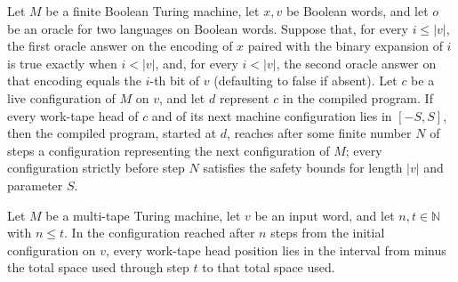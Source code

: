 \begin{theorem}
\label{Complexity.LogProg.OIS.represented_step}
\leanok
{}
Let $M$ be a finite Boolean Turing machine, let $x,v$ be Boolean words, and let $o$ be
an oracle for two languages on Boolean words. Suppose that, for every $i\le |v|$, the
first oracle answer on the encoding of $x$ paired with the binary expansion of $i$ is
true exactly when $i<|v|$, and, for every $i<|v|$, the second oracle answer on that
encoding equals the $i$-th bit of $v$ (defaulting to false if absent). Let $c$ be a live
configuration of $M$ on $v$, and let $d$ represent $c$ in the compiled program. If every
work-tape head of $c$ and of its next machine configuration lies in $[-S,S]$, then the
compiled program, started at $d$, reaches after some finite number $N$ of steps a
configuration representing the next configuration of $M$; every configuration strictly
before step $N$ satisfies the safety bounds for length $|v|$ and parameter $S$.
\end{theorem}

\begin{theorem}
\label{Complexity.LogProg.OIS.source_head_bounds}
\leanok
{}
Let $M$ be a multi-tape Turing machine, let $v$ be an input word, and let
$n,t\in\mathbb{N}$ with $n\le t$. In the configuration reached after $n$ steps from the
initial configuration on $v$, every work-tape head position lies in the interval from
minus the total space used through step $t$ to that total space used.
\end{theorem}

